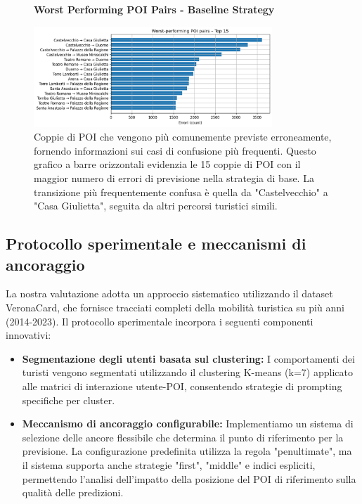 \begin{itemize}
\begin{enumerate}
\begin{figure}[H]
\centering
\textbf{Worst Performing POI Pairs - Baseline Strategy}\par
\vspace{0.5em}
\includegraphics[width=0.8\textwidth]{../../img/SPACE-GEO_n-1_come_current_POI/Worst_performing_POI_pairs.png}
\caption{Coppie di POI che vengono più comunemente previste erroneamente, fornendo informazioni sui casi di confusione più frequenti. Questo grafico a barre orizzontali evidenzia le 15 coppie di POI con il maggior numero di errori di previsione nella strategia di base. La transizione più frequentemente confusa è quella da "Castelvecchio" a "Casa Giulietta", seguita da altri percorsi turistici simili.}
\label{fig:baseline_worst_pairs}
\end{figure}

\end{enumerate}

\subsection{Protocollo sperimentale e meccanismi di ancoraggio}

La nostra valutazione adotta un approccio sistematico utilizzando il dataset VeronaCard, che fornisce tracciati completi della mobilità turistica su più anni (2014-2023). Il protocollo sperimentale incorpora i seguenti componenti innovativi:

\begin{itemize}
\item \textbf{Segmentazione degli utenti basata sul clustering:} I comportamenti dei turisti vengono segmentati utilizzando il clustering K-means (k=7) applicato alle matrici di interazione utente-POI, consentendo strategie di prompting specifiche per cluster.

\item \textbf{Meccanismo di ancoraggio configurabile:} Implementiamo un sistema di selezione delle ancore flessibile che determina il punto di riferimento per la previsione. La configurazione predefinita utilizza la regola "penultimate", ma il sistema supporta anche strategie "first", "middle" e indici espliciti, permettendo l'analisi dell'impatto della posizione del POI di riferimento sulla qualità delle predizioni.


\end{itemize}
\end{itemize}
